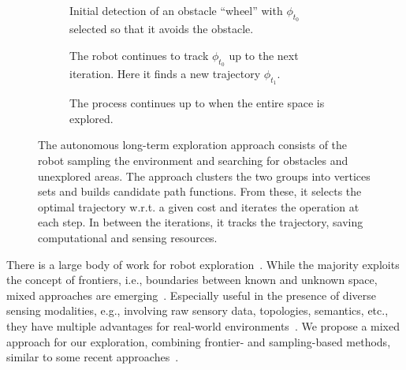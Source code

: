 \documentclass[lettersize,journal,twoside]{IEEEtran}
\theoremstyle{definition}
\begin{document}
\begin{figure*}
  \begin{subfigure}[m]{0.33\textwidth}
    \centering
    
    \caption{Initial detection of an obstacle ``wheel'' with $\phi_{t_0}$ selected so that it avoids the obstacle.}
    \label{fig:3-1}
  \end{subfigure}
  \hfill
  \begin{subfigure}[m]{0.32\textwidth}
    \centering
    \hspace*{-.15cm}
    
    \caption{The robot continues to track $\phi_{t_0}$ up to the next iteration. Here it finds a new trajectory $\phi_{t_1}$.}
    \label{fig:3-2}
  \end{subfigure}
  \begin{subfigure}[m]{0.33\textwidth}
    \centering
    \hspace*{.05cm}
    
    \caption{The process continues up to when the entire space is explored.}
    \label{fig:3-3}
  \end{subfigure}
  \caption{The autonomous long-term %
  exploration %
  approach consists of the robot sampling the environment and searching for obstacles and unexplored areas. The %
  approach clusters the two groups into vertices sets and builds candidate path functions. From these, it selects the optimal trajectory w.r.t. a given cost and iterates the operation at each step. In between the iterations, it tracks the trajectory, saving computational and sensing resources.}
  \label{fig:3}
\end{figure*}
\noindent
There is a large body of work for robot exploration~\cite{%
placed2022survey,dang2019graph}. %
While the majority exploits the concept of frontiers, %
i.e., boundaries between known and unknown space, mixed approaches are emerging~\cite{dai2020fast,schmid2020efficient,placed2022survey}. 
Especially useful in the presence of diverse sensing modalities, e.g., involving raw sensory data, topologies, semantics, etc., they have multiple %
advantages for real-world environments~\cite{placed2022survey,batinovic2021multi}. 
%
We propose a %
mixed approach for our %
exploration, %
combining frontier- and sampling-based methods, similar to some recent approaches~\cite{dai2020fast,%
shrestha2019learned}. %
\end{document}
